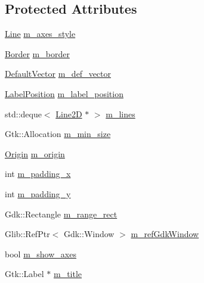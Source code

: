 \subsection*{Protected Attributes}
\begin{DoxyCompactItemize}
\item 
\hyperlink{structGtk_1_1Plot_1_1Border}{Line} \hyperlink{classGtk_1_1Plot_1_1Area_a46e921e38d4f06b75fa733ead0e3e153}{m\_\-axes\_\-style}
\item 
\hyperlink{structGtk_1_1Plot_1_1Border}{Border} \hyperlink{classGtk_1_1Plot_1_1Area_a64ed564fa355d20fa2e85c39bf681505}{m\_\-border}
\item 
\hyperlink{namespaceGtk_1_1Plot_aa7cadb8fb1ada346afe4e3acce74600d}{DefaultVector} \hyperlink{classGtk_1_1Plot_1_1Area_acca72f1dfcaf243905f2f2a72383a0a6}{m\_\-def\_\-vector}
\item 
\hyperlink{namespaceGtk_1_1Plot_a125746674247df0f29cb6d6aa8089cb6}{LabelPosition} \hyperlink{classGtk_1_1Plot_1_1Area_a1f3ef841a840e36e86451344a6b2ab12}{m\_\-label\_\-position}
\item 
std::deque$<$ \hyperlink{classGtk_1_1Plot_1_1Line2D}{Line2D} $\ast$ $>$ \hyperlink{classGtk_1_1Plot_1_1Area_aec9a3973b17514a371d75780dd525499}{m\_\-lines}
\item 
Gtk::Allocation \hyperlink{classGtk_1_1Plot_1_1Area_ae7f8e7f943559993a00a50f612158d8a}{m\_\-min\_\-size}
\item 
\hyperlink{namespaceGtk_1_1Plot_a0ce4e6f495df606dd5b947ea1512490f}{Origin} \hyperlink{classGtk_1_1Plot_1_1Area_acd35e208c895c011d2cd8803bab9fb05}{m\_\-origin}
\item 
int \hyperlink{classGtk_1_1Plot_1_1Area_a2f9c13393566c0dafb7ef3f95241fa87}{m\_\-padding\_\-x}
\item 
int \hyperlink{classGtk_1_1Plot_1_1Area_a54d14872d49c140d832b0fb75ad8f55d}{m\_\-padding\_\-y}
\item 
Gdk::Rectangle \hyperlink{classGtk_1_1Plot_1_1Area_aed0c26f548c6de73e8d91a1b359ac30d}{m\_\-range\_\-rect}
\item 
Glib::RefPtr$<$ Gdk::Window $>$ \hyperlink{classGtk_1_1Plot_1_1Area_ad3f7f9608995f133a30760540a0ed745}{m\_\-refGdkWindow}
\item 
bool \hyperlink{classGtk_1_1Plot_1_1Area_ae7bc177b3fd37a14aed42cbbc8051386}{m\_\-show\_\-axes}
\item 
Gtk::Label $\ast$ \hyperlink{classGtk_1_1Plot_1_1Area_ab3723bf8b688502a83052ae90f4d931a}{m\_\-title}
\end{DoxyCompactItemize}


